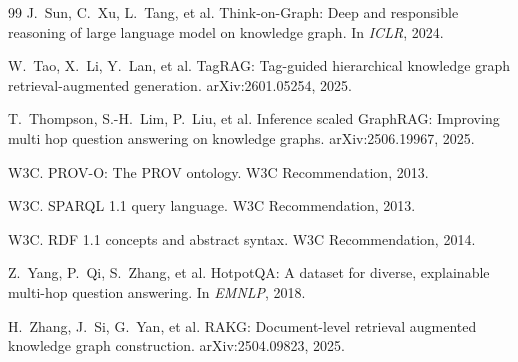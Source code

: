 \documentclass[11pt]{article}
\begin{document}
\begin{thebibliography}{99}
 J.~Sun, C.~Xu, L.~Tang, et al. Think-on-Graph: Deep and responsible reasoning of large language model on knowledge graph. In \emph{ICLR}, 2024.

 W.~Tao, X.~Li, Y.~Lan, et al. TagRAG: Tag-guided hierarchical knowledge graph retrieval-augmented generation. arXiv:2601.05254, 2025.

 T.~Thompson, S.-H.~Lim, P.~Liu, et al. Inference scaled GraphRAG: Improving multi hop question answering on knowledge graphs. arXiv:2506.19967, 2025.

 W3C. PROV-O: The PROV ontology. W3C Recommendation, 2013.

 W3C. SPARQL 1.1 query language. W3C Recommendation, 2013.

 W3C. RDF 1.1 concepts and abstract syntax. W3C Recommendation, 2014.

 Z.~Yang, P.~Qi, S.~Zhang, et al. HotpotQA: A dataset for diverse, explainable multi-hop question answering. In \emph{EMNLP}, 2018.

 H.~Zhang, J.~Si, G.~Yan, et al. RAKG: Document-level retrieval augmented knowledge graph construction. arXiv:2504.09823, 2025.

\end{thebibliography}
\end{document}
